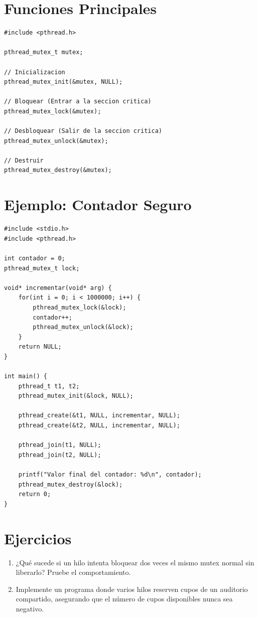\documentclass[12pt,a4paper]{article}
\begin{document}
\newpage

\section{Funciones Principales}
\begin{lstlisting}[numbers=none]
#include <pthread.h>

pthread_mutex_t mutex;

// Inicializacion
pthread_mutex_init(&mutex, NULL);

// Bloquear (Entrar a la seccion critica)
pthread_mutex_lock(&mutex);

// Desbloquear (Salir de la seccion critica)
pthread_mutex_unlock(&mutex);

// Destruir
pthread_mutex_destroy(&mutex);
\end{lstlisting}

\section{Ejemplo: Contador Seguro}
\begin{lstlisting}
#include <stdio.h>
#include <pthread.h>

int contador = 0;
pthread_mutex_t lock;

void* incrementar(void* arg) {
    for(int i = 0; i < 1000000; i++) {
        pthread_mutex_lock(&lock);
        contador++;
        pthread_mutex_unlock(&lock);
    }
    return NULL;
}

int main() {
    pthread_t t1, t2;
    pthread_mutex_init(&lock, NULL);

    pthread_create(&t1, NULL, incrementar, NULL);
    pthread_create(&t2, NULL, incrementar, NULL);

    pthread_join(t1, NULL);
    pthread_join(t2, NULL);

    printf("Valor final del contador: %d\n", contador);
    pthread_mutex_destroy(&lock);
    return 0;
}
\end{lstlisting}

\section{Ejercicios}
\begin{enumerate}
    \item ¿Qué sucede si un hilo intenta bloquear dos veces el mismo mutex normal sin liberarlo? Pruebe el comportamiento.
    \item Implemente un programa donde varios hilos reserven cupos de un auditorio compartido, asegurando que el número de cupos disponibles nunca sea negativo.
\end{enumerate}
\end{document}
